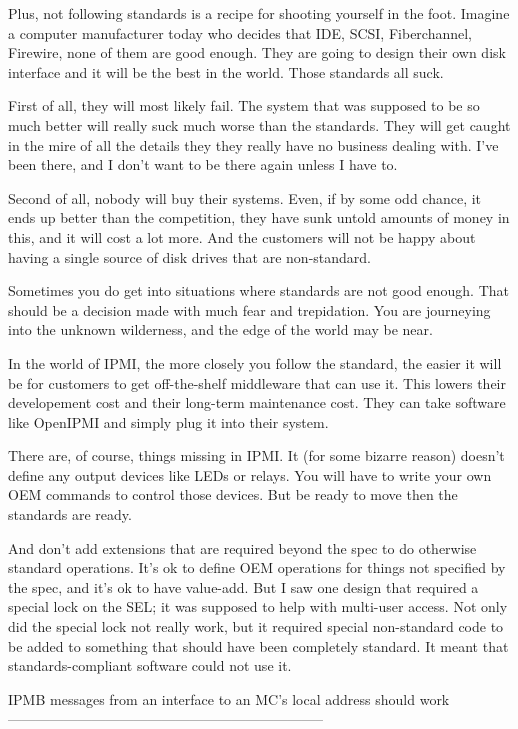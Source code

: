 Plus, not following standards is a recipe for shooting yourself in the
foot.  Imagine a computer manufacturer today who decides that IDE,
SCSI, Fiberchannel, Firewire, none of them are good enough.  They are
going to design their own disk interface and it will be the best in
the world.  Those standards all suck.

First of all, they will most likely fail.  The system that was
supposed to be so much better will really suck much worse than the
standards.  They will get caught in the mire of all the details they
they really have no business dealing with.  I've been there, and I
don't want to be there again unless I have to.

Second of all, nobody will buy their systems.  Even, if by some odd
chance, it ends up better than the competition, they have sunk untold
amounts of money in this, and it will cost a lot more.  And the
customers will not be happy about having a single source of disk
drives that are non-standard.

Sometimes you do get into situations where standards are not good
enough.  That should be a decision made with much fear and
trepidation.  You are journeying into the unknown wilderness, and the
edge of the world may be near.

In the world of IPMI, the more closely you follow the standard, the
easier it will be for customers to get off-the-shelf middleware that
can use it.  This lowers their developement cost and their long-term
maintenance cost.  They can take software like OpenIPMI and simply
plug it into their system.

There are, of course, things missing in IPMI.  It (for some bizarre
reason) doesn't define any output devices like LEDs or relays.  You
will have to write your own OEM commands to control those devices.
But be ready to move then the standards are ready.

And don't add extensions that are required beyond the spec to do
otherwise standard operations.  It's ok to define OEM operations for
things not specified by the spec, and it's ok to have value-add.  But
I saw one design that required a special lock on the SEL; it was
supposed to help with multi-user access.  Not only did the special
lock not really work, but it required special non-standard code to be
added to something that should have been completely standard.  It
meant that standards-compliant software could not use it.


IPMB messages from an interface to an MC's local address should work
--------------------------------------------------------------------

